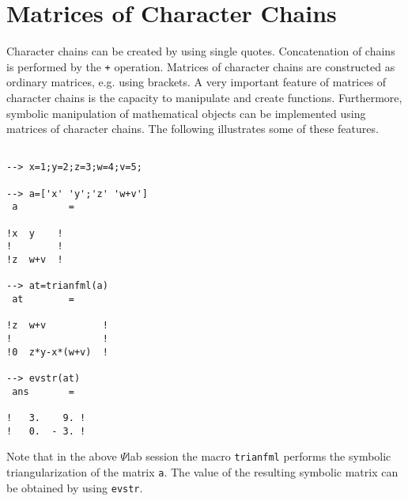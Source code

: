 \section{Matrices of Character Chains}
\label{s2.3}

	Character chains can be created by using single quotes.
Concatenation of chains is performed by the {\tt +} operation.
Matrices of character chains are constructed as ordinary matrices,
e.g. using brackets.
A very important feature of matrices of character chains is
the capacity to manipulate and create functions.  Furthermore,
symbolic manipulation of mathematical objects can be implemented
using matrices of character chains.  The following illustrates
some of these features. 
\begin{verbatim}
 
--> x=1;y=2;z=3;w=4;v=5;
 
--> a=['x' 'y';'z' 'w+v']
 a         =
 
!x  y    !
!        !
!z  w+v  !
 
--> at=trianfml(a)
 at        =
 
!z  w+v          !
!                !
!0  z*y-x*(w+v)  !
 
--> evstr(at)
 ans       =
 
!   3.    9. !
!   0.  - 3. !
\end{verbatim}
Note that in the above $\Psi$lab session the macro 
{\tt trianfml}
performs the symbolic triangularization of the matrix {\tt a}.
The value of the resulting symbolic matrix can be obtained by
using {\tt evstr}.  

